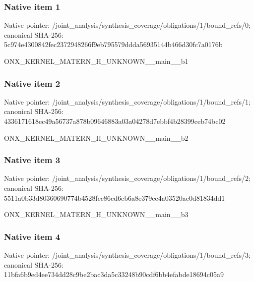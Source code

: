 \documentclass[10pt,a4paper]{article}
\begin{document}
\subsubsection{Native item 1}
Native pointer: /joint\_\allowbreak{}analysis/synthesis\_\allowbreak{}coverage/obligations/1/bound\_\allowbreak{}refs/0; canonical SHA-256: 5c974e4300842fec2372948266f9eb795579ddda56935144b466d30fc7a0176b

\begingroup\raggedright\sloppy ONX\_\allowbreak{}KERNEL\_\allowbreak{}MATERN\_\allowbreak{}H\_\allowbreak{}UNKNOWN\_\allowbreak{}\_\allowbreak{}main\_\allowbreak{}\_\allowbreak{}b1\par\endgroup

\subsubsection{Native item 2}
Native pointer: /joint\_\allowbreak{}analysis/synthesis\_\allowbreak{}coverage/obligations/1/bound\_\allowbreak{}refs/1; canonical SHA-256: 4336171618ec49a56737a878b09646883a03a04278d7ebbf4b28399ceb74bc02

\begingroup\raggedright\sloppy ONX\_\allowbreak{}KERNEL\_\allowbreak{}MATERN\_\allowbreak{}H\_\allowbreak{}UNKNOWN\_\allowbreak{}\_\allowbreak{}main\_\allowbreak{}\_\allowbreak{}b2\par\endgroup

\subsubsection{Native item 3}
Native pointer: /joint\_\allowbreak{}analysis/synthesis\_\allowbreak{}coverage/obligations/1/bound\_\allowbreak{}refs/2; canonical SHA-256: 5511a0b33d80360690774b4528fec86cd6cb6a8e379ce4a03520ae0d81834dd1

\begingroup\raggedright\sloppy ONX\_\allowbreak{}KERNEL\_\allowbreak{}MATERN\_\allowbreak{}H\_\allowbreak{}UNKNOWN\_\allowbreak{}\_\allowbreak{}main\_\allowbreak{}\_\allowbreak{}b3\par\endgroup

\subsubsection{Native item 4}
Native pointer: /joint\_\allowbreak{}analysis/synthesis\_\allowbreak{}coverage/obligations/1/bound\_\allowbreak{}refs/3; canonical SHA-256: 11bfa6b9ed4ee734dd28c9be2bac3da5c33248b90cdf6bb4efabde18694c05a9
\end{document}

